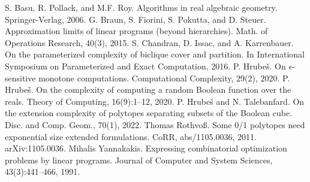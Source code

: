 
 S. Basu, R. Pollack, and M.F. Roy. Algorithms in real algebraic geometry. Springer-Verlag, 2006.
 G. Braun, S. Fiorini, S. Pokutta, and D. Steuer. Approximation limits of linear programs (beyond hierarchies). Math. of Operations Research, 40(3), 2015.
 S. Chandran, D. Issac, and A. Karrenbauer. On the parameterized complexity of biclique cover and partition. In International Symposium on Parameterized and Exact Computation, 2016.
 P. Hrube\v{s}. On $\epsilon$-sensitive monotone computations. Computational Complexity, 29(2), 2020.
 P. Hrube\v{s}. On the complexity of computing a random Boolean function over the reals. Theory of Computing, 16(9):1--12, 2020.
 P. Hrube\v{s} and N. Talebanfard. On the extension complexity of polytopes separating subsets of the Boolean cube. Disc. and Comp. Geom., 70(1), 2022.
 Thomas Rothvo\ss. Some 0/1 polytopes need exponential size extended formulations. CoRR, abs/1105.0036, 2011. arXiv:1105.0036.
 Mihalis Yannakakis. Expressing combinatorial optimization problems by linear programs. Journal of Computer and System Sciences, 43(3):441--466, 1991.


